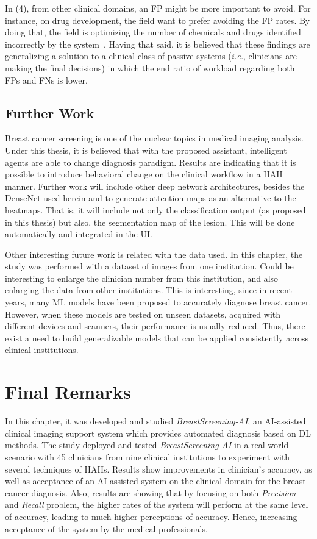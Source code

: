 In (4), from other clinical domains, an \ac{FP} might be more important to avoid.
For instance, on drug development, the field want to prefer avoiding the \ac{FP} rates.
By doing that, the field is optimizing the number of chemicals and drugs identified incorrectly by the system~\cite{raja2017machine}.
Having that said, it is believed that these findings are generalizing a solution to a clinical class of passive systems ({\it i.e.}, clinicians are making the final decisions) in which the end ratio of workload regarding both \acp{FP} and \acp{FN} is lower.

\subsection{Further Work}
\label{sec:app002005004}

Breast cancer screening is one of the nuclear topics in medical imaging analysis.
Under this thesis, it is believed that with the proposed assistant, intelligent agents are able to change diagnosis paradigm.
Results are indicating that it is possible to introduce behavioral change on the clinical workflow in a \ac{HAII} manner.
Further work will include other deep network architectures, besides the DenseNet used herein and to generate attention maps as an alternative to the heatmaps.
That is, it will include not only the classification output (as proposed in this thesis) but also, the segmentation map of the lesion.
This will be done automatically and integrated in the \ac{UI}.

Other interesting future work is related with the data used. 
In this chapter, the study was performed with a dataset of images from one institution.
Could be interesting to enlarge the clinician number from this institution, and also enlarging the data from other institutions.
This is interesting, since in recent years, many \ac{ML} models have been proposed to accurately diagnose breast cancer.
However, when these models are tested on unseen datasets, acquired with different devices and scanners, their performance is usually reduced.
Thus, there exist a need to build generalizable models that can be applied consistently across clinical institutions.

\section{Final Remarks}
\label{sec:app002006}

In this chapter, it was developed and studied {\it BreastScreening-AI}, an \ac{AI}-assisted clinical imaging support system which provides automated diagnosis based on \ac{DL} methods.
The study deployed and tested {\it BreastScreening-AI} in a real-world scenario with 45 clinicians from nine clinical institutions to experiment with several techniques of \acp{HAII}.
Results show improvements in clinician’s accuracy, as well as acceptance of an \ac{AI}-assisted system on the clinical domain for the breast cancer diagnosis.
Also, results are showing that by focusing on both {\it Precision} and {\it Recall} problem, the higher rates of the system will perform at the same level of accuracy, leading to much higher perceptions of accuracy.
Hence, increasing acceptance of the system by the medical professionals.

